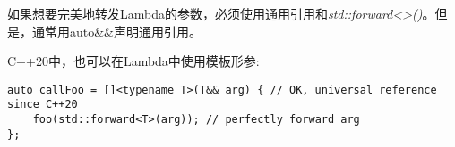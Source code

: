 如果想要完美地转发Lambda的参数，必须使用通用引用和\textit{std::forward<>()}。但是，通常用auto\&\&声明通用引用。\par

C++20中，也可以在Lambda中使用模板形参:\par

\begin{lstlisting}[caption={}]
auto callFoo = []<typename T>(T&& arg) { // OK, universal reference since C++20
	foo(std::forward<T>(arg)); // perfectly forward arg
};
\end{lstlisting}

